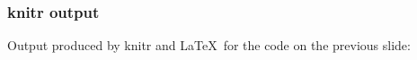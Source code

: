 \documentclass{beamer}
\begin{document}
\begin{frame}
  \frametitle{knitr output}

Output produced by knitr and \LaTeX\ for the code on the previous slide:


\begin{center}
\end{center}


\end{frame}
\end{document}
